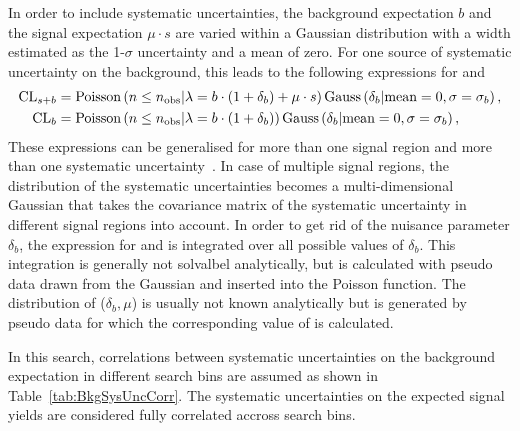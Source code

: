 In order to include systematic uncertainties, the background expectation $b$ and the signal expectation $\mu\cdot s$ are varied within a Gaussian distribution with a width estimated as the 1-$\sigma$ uncertainty and a mean of zero.
For one source of systematic uncertainty on the background, this leads to the following expressions for \CLsb and \CLb
\begin{equation*}
\begin{split}
\text{CL}_{s+b} &= \text{Poisson}\left( n \leq n_{\text{obs}} |\lambda = b \cdot (1+\delta_b)+\mu\cdot s   \right) \text{Gauss}\left(\delta_b|\text{mean}=0, \sigma = \sigma_b\right),\\
\text{CL}_{b}  &= \text{Poisson}\left( n \leq n_{\text{obs}} |\lambda = b \cdot (1+\delta_b)   \right) \text{Gauss}\left(\delta_b|\text{mean}=0, \sigma = \sigma_b\right),
\end{split}
\end{equation*}
These expressions can be generalised for more than one signal region and more than one systematic uncertainty~\cite{bib:Ott_Thesis}.
In case of multiple signal regions, the distribution of the systematic uncertainties becomes a multi-dimensional Gaussian that takes the covariance matrix of the systematic uncertainty in different signal regions into account.
In order to get rid of the nuisance parameter $\delta_b$, the expression for \CLsb and \CLs is integrated over all possible values of  $\delta_b$.
This integration is generally not solvalbel analytically, but is calculated with pseudo data drawn from the Gaussian and inserted into the Poisson function.
The distribution of \CLsb($\delta_b,\mu$) is usually not known analytically but is generated by pseudo data for which the corresponding value of \CLsb is calculated.


In this search, correlations between systematic uncertainties on the background expectation in different search bins are assumed as shown in Table~\ref{tab:BkgSysUncCorr}.
The systematic uncertainties on the expected signal yields are considered fully correlated accross search bins.

